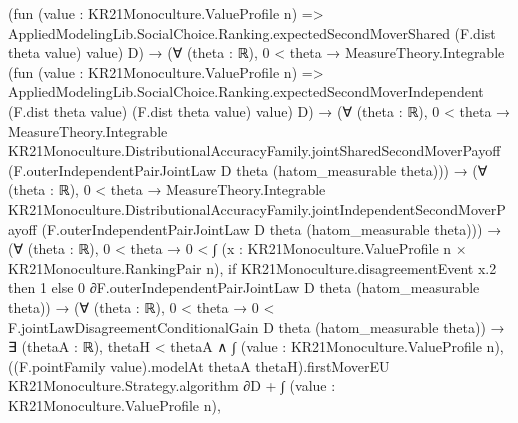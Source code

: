 \documentclass[10pt]{article}
\begin{document}
\begin{ReviewVerbatim}
                                (fun (value : KR21Monoculture.ValueProfile n) =>
                                  AppliedModelingLib.SocialChoice.Ranking.expectedSecondMoverShared (F.dist theta value)
                                    value)
                                D) →
                          (∀ (theta : ℝ),
                              0 < theta →
                                MeasureTheory.Integrable
                                  (fun (value : KR21Monoculture.ValueProfile n) =>
                                    AppliedModelingLib.SocialChoice.Ranking.expectedSecondMoverIndependent
                                      (F.dist theta value) (F.dist theta value) value)
                                  D) →
                            (∀ (theta : ℝ),
                                0 < theta →
                                  MeasureTheory.Integrable
                                    KR21Monoculture.DistributionalAccuracyFamily.jointSharedSecondMoverPayoff
                                    (F.outerIndependentPairJointLaw D theta (hatom_measurable theta))) →
                              (∀ (theta : ℝ),
                                  0 < theta →
                                    MeasureTheory.Integrable
                                      KR21Monoculture.DistributionalAccuracyFamily.jointIndependentSecondMoverPayoff
                                      (F.outerIndependentPairJointLaw D theta (hatom_measurable theta))) →
                                (∀ (theta : ℝ),
                                    0 < theta →
                                      0 <
                                        ∫ (x : KR21Monoculture.ValueProfile n × KR21Monoculture.RankingPair n),
                                          if KR21Monoculture.disagreementEvent x.2 then 1
                                          else 0 ∂F.outerIndependentPairJointLaw D theta (hatom_measurable theta)) →
                                  (∀ (theta : ℝ),
                                      0 < theta →
                                        0 < F.jointLawDisagreementConditionalGain D theta (hatom_measurable theta)) →
                                    ∃ (thetaA : ℝ),
                                      thetaH < thetaA ∧
                                        ∫ (value : KR21Monoculture.ValueProfile n),
                                              ((F.pointFamily value).modelAt thetaA thetaH).firstMoverEU
                                                KR21Monoculture.Strategy.algorithm ∂D +
                                            ∫ (value : KR21Monoculture.ValueProfile n),

\end{ReviewVerbatim}
\end{document}
